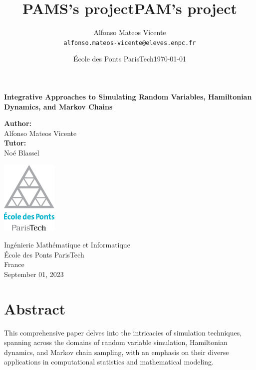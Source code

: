 \documentclass{report}
\title{PAMS's project} %
\author{Alfonso Mateos Vicente\\ \texttt{alfonso.mateos-vicente@eleves.enpc.fr}} %
\date{École des Ponts ParisTech} %
\title{PAM's project}
\date{\today}
\begin{document}
\begin{titlepage}
    \begin{center}
        \vspace*{1cm}
        
        \Huge
        \textbf{Integrative Approaches to Simulating Random Variables, Hamiltonian Dynamics, and Markov Chains}
        
        \vspace{1.5cm}

        \Large
        \textbf{Author:} \\
        \vspace{0.25cm}
        \LARGE
        Alfonso Mateos Vicente \\
        \vspace{0.5cm}
        \Large
        \textbf{Tutor:} \\
        \vspace{0.25cm}
        \LARGE
        Noé Blassel

        \vfill
        
        \includegraphics[width=0.2\textwidth]{./logo-enpc.eps}
        
        \vspace{1cm}
        
        \normalsize
        Ingénierie Mathématique et Informatique \\
        École des Ponts ParisTech \\
        France \\
        September 01, 2023
    \end{center}
    \restoregeometry
\end{titlepage}


\newpage
\tableofcontents
\newpage

\chapter*{Abstract}

This comprehensive paper delves into the intricacies of simulation techniques, spanning across the domains of random variable simulation, Hamiltonian dynamics, and Markov chain sampling, with an emphasis on their diverse applications in computational statistics and mathematical modeling.
\end{document}
